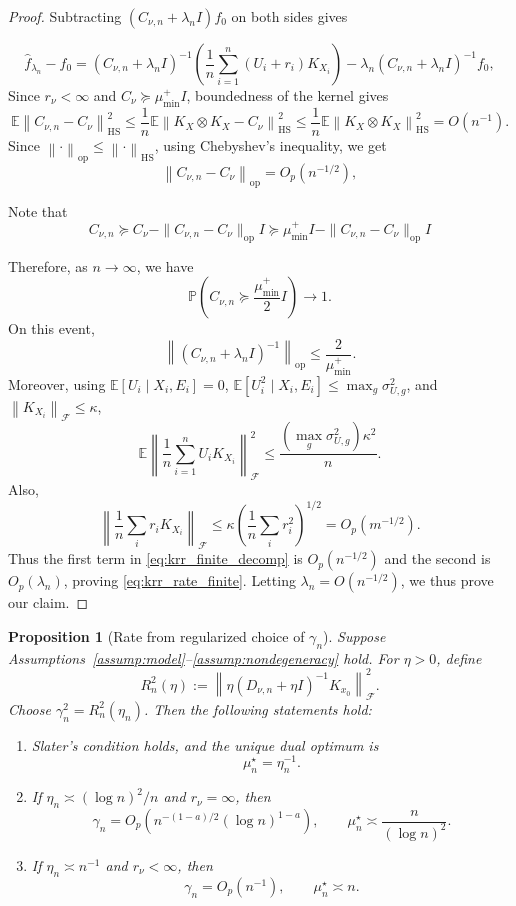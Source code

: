\documentclass[11pt]{article}
\newtheorem{proposition}{Proposition}[section]
\newcommand{\E}{\mathbb{E}}
\newcommand{\Pp}{\mathbb{P}}
\newcommand{\F}{\mathcal{F}}
\newcommand{\op}{\mathrm{op}}
\newcommand{\HS}{\mathrm{HS}}
\newcommand{\norm}[1]{\left\lVert #1\right\rVert}
\newcommand{\succeqL}{\succeq}
\begin{document}
\begin{proof}
Subtracting $(C_{\nu,n}+\lambda_n I) f_0$  on both sides gives

\begin{equation}
  \widehat f_{\lambda_n}-f_0
  =
  (C_{\nu,n}+\lambda_n I)^{-1}
  \left(\frac1n\sum_{i=1}^n(U_i+r_i)K_{X_i}\right)
  -
  \lambda_n(C_{\nu,n}+\lambda_n I)^{-1}f_0,
  \label{eq:krr_finite_decomp}
\end{equation}
Since $r_\nu<\infty$ and $C_\nu\succeqL\mu_{\min}^+I$, boundedness of the kernel gives
\[
  \E\norm{C_{\nu,n}-C_\nu}_{\HS}^2
  \leq
  \frac1n\E\norm{K_X\otimes K_X-C_\nu}_{\HS}^2
   \leq
  \frac1n\E\norm{K_X\otimes K_X}_{\HS}^2
  =O(n^{-1}).
\]
Since $\norm{\cdot}_{\op}\le\norm{\cdot}_{\HS}$, using Chebyshev's inequality, we get
\[
  \norm{C_{\nu,n}-C_\nu}_{\op}=O_p(n^{-1/2}),
\]

Note that 
\[C_{\nu,n} \succeq C_\nu - \|C_{\nu,n} - C_{\nu}\|_{\op} I \succeq \mu^+_{\min}I - \|C_{\nu,n} - C_{\nu}\|_{\op} I\] 

Therefore, as $n \to \infty$, we have 
\[
  \Pp\!\left(
  C_{\nu,n}\succeqL\frac{\mu_{\min}^+}{2}I
  \right)\longrightarrow1.
\]
On this event,
\[
  \norm{(C_{\nu,n}+\lambda_n I)^{-1}}_{\op}
  \le\frac{2}{\mu_{\min}^+}.
\]
Moreover, using $\E[U_i\mid X_i,E_i]=0$, $\E[U_i^2\mid X_i,E_i]\leq\max_g\sigma_{U,g}^2$, and $\norm{K_{X_i}}_{\F}\le\kappa$,
\[
  \E\left\|
  \frac1n\sum_{i=1}^nU_iK_{X_i}
  \right\|_{\F}^2
  \le
  \frac{(\max_g\sigma_{U,g}^2)\kappa^2}{n}.
\]
Also,
\[
 \norm{\frac1n\sum_i r_iK_{X_i}}_{\F}
 \leq\kappa\left(\frac1n\sum_i r_i^2\right)^{1/2}=O_p(m^{-1/2}).
\]
Thus the first term in \eqref{eq:krr_finite_decomp} is $O_p(n^{-1/2})$ and the second is $O_p(\lambda_n)$, proving \eqref{eq:krr_rate_finite}. Letting $\lambda_n=O(n^{-1/2})$, we thus prove our claim.
\end{proof}


\begin{proposition}
[Rate from regularized choice of $\gamma_n$]
\label{prop:regularized_gamma}
Suppose Assumptions~\ref{assump:model}--\ref{assump:nondegeneracy} hold. For $\eta>0$, define
\[
  R_n^2(\eta)
  :=\norm{\eta(D_{\nu,n}+\eta I)^{-1}K_{x_0}}_{\F}^2.
\]
Choose $\gamma_n^2=R_n^2(\eta_n)$. Then the following statements hold:
\begin{enumerate}[label=(\roman*)]
  \item Slater's condition holds, and the unique dual optimum is
  \[
    \mu_n^\star=\eta_n^{-1}.
  \]

  \item If $\eta_n\asymp (\log n)^2/n$ and $r_\nu=\infty$, then
  \[
    \gamma_n=O_p\!\left(n^{-(1-a)/2}(\log n)^{1-a}\right),
    \qquad
    \mu_n^\star\asymp \frac{n}{(\log n)^2}.
  \]

  \item If $\eta_n\asymp n^{-1}$ and $r_\nu<\infty$, then
  \[
    \gamma_n=O_p(n^{-1}),
    \qquad
    \mu_n^\star\asymp n.
  \]
\end{enumerate}
\end{proposition}
\end{document}
